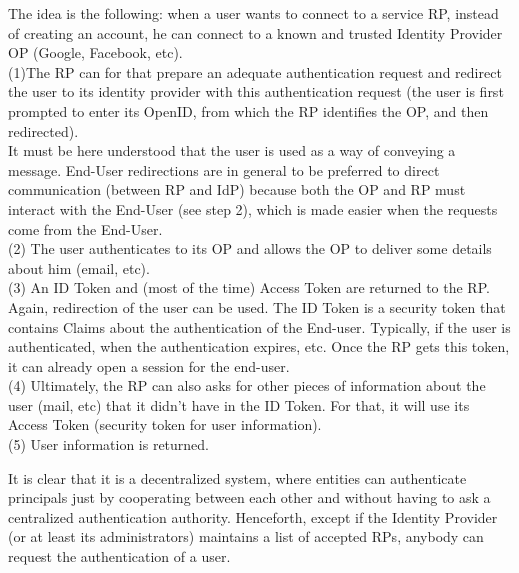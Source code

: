 The idea is the following: when a user wants to connect to a service RP, instead of creating an account, he can connect to a known and trusted Identity Provider OP (Google, Facebook, etc). 
\\(1)The RP can for that prepare an adequate authentication request and redirect the user to its identity provider with this authentication request (the user is first prompted to enter its OpenID, from which the RP identifies the OP, and then redirected). 
\\It must be here understood that the user is used as a way of conveying a message. End-User redirections are in general to be preferred to direct communication (between RP and IdP) because both the OP and RP must interact with the End-User (see step 2), which is made easier when the requests come from the End-User.
\\(2) The user authenticates to its OP and allows the OP to deliver some details about him (email, etc).
\\(3) An ID Token and (most of the time) Access Token are returned to the RP. Again, redirection of the user can be used. The ID Token is a security token that contains Claims about the authentication of the End-user. Typically, if the user is authenticated, when the authentication expires, etc. Once the RP gets this token, it can already open a session for the end-user.
\\(4) Ultimately, the RP can also asks for other pieces of information about the user (mail, etc) that it didn't have in the ID Token. For that, it will use its Access Token (security token for user information).
\\(5) User information is returned.




It is clear that it is a decentralized system, where entities can authenticate principals just by cooperating between each other and without having to ask a centralized authentication authority. Henceforth, except if the Identity Provider (or at least its administrators) maintains a list of accepted RPs, anybody can request the authentication of a user.
\\


